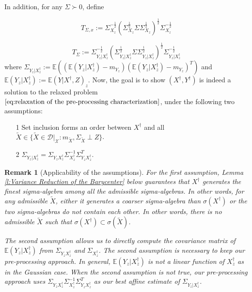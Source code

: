 \documentclass[twoside,11pt]{article}
\newtheorem{rema}{Remark}[section]{\bfseries}{\itshape}
\begin{document}
In addition, for any $\Sigma \succ 0$, define

\begin{equation}
T_{\Sigma,x} := \Sigma_{X_z}^{-\frac{1}{2}}(\Sigma_{X_z}^{\frac{1}{2}} \Sigma \Sigma_{X_z}^{\frac{1}{2}})^{\frac{1}{2}}\Sigma_{X_z}^{-\frac{1}{2}}
\end{equation}

\begin{equation}
T_{\Sigma} := \Sigma_{Y_z|X^{\dag}_z}^{-\frac{1}{2}}(\Sigma_{Y_z|X^{\dag}_z}^{\frac{1}{2}} \Sigma \Sigma_{Y_z|X^{\dag}_z}^{\frac{1}{2}})^{\frac{1}{2}}\Sigma_{Y_z|X^{\dag}_z}^{-\frac{1}{2}}
\end{equation}
where $\Sigma_{Y_z|X^{\dag}_z} := \mathbb{E}((\mathbb{E}(Y_z|X^{\dag}_z) - m_{Y_z})(\mathbb{E}(Y_z|X^{\dag}_z) - m_{Y_z})^T)$ and $\mathbb{E}(Y_z|X^{\dag}_z) := \mathbb{E}(Y|X^{\dag},Z)_z$. Now, the goal is to show $(X^{\dag}, Y^{\dag})$ is indeed a solution to the relaxed problem $\eqref{eq:relaxation of the pre-processing characterization}$, under the following two assumptions:

\begin{itemize} \label{assumptions for general distribution}
\item[1] Set inclusion forms an order between $X^{\dag}$ and all $\tilde{X} \in \{\tilde{X} \in \mathcal{D}|_{\mathcal{X}} : m_{\tilde{X}}, \Sigma_{\tilde{X}} \perp Z\}$.
\item[2] $\Sigma_{Y_z|X^{\dag}_z} = \Sigma_{Y_z X^{\dag}_z} \Sigma_{X^{\dag}_z}^{-1} \Sigma_{Y_z X^{\dag}_z}^T$. 
\end{itemize}

\begin{rema}[Applicability of the assumptions] \label{r:Applicability of the Assumptions}
For the first assumption, Lemma \ref{l:Variance Reduction of the Barycenter} below guarantees that $X^{\dag}$ generates the finest sigma-algebra among all the admissible sigma-algebras. In other words, for any admissible $\tilde{X}$, either it generates a coarser sigma-algebra than $\sigma(X^{\dag})$ or the two sigma-algebras do not contain each other. In other words, there is no admissible $\tilde{X}$ such that $\sigma(X^{\dag}) \subset \sigma(\tilde{X})$.

The second assumption allows us to directly compute the covariance matrix of $\mathbb{E}(Y_z|X^{\dag}_z)$ from $\Sigma_{Y_z X^{\dag}_z}$ and  $\Sigma_{X^{\dag}_z}$. The second assumption is necessary to keep our pre-processing approach. In general, $\mathbb{E}(Y_z|X^{\dag}_z)$ is not a linear function of $X^{\dag}_z$ as in the Gaussian case. When the second assumption is not true, our pre-processing approach uses $\Sigma_{Y_z X^{\dag}_z} \Sigma_{X^{\dag}_z}^{-1} \Sigma_{Y_z X^{\dag}_z}^T$ as our best affine estimate of $\Sigma_{Y_z|X^{\dag}_z}$.
\end{rema}
\end{document}
